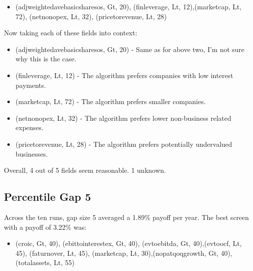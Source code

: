 \begin{itemize}
    \item (adjweightedavebasicsharesos, Gt, 20), (finleverage, Lt, 12),\newline (marketcap, Lt, 72), (netnonopex, Lt, 32), (pricetorevenue, Lt, 28)
\end{itemize}

Now taking each of these fields into context:
\begin{itemize}
    \item (adjweightedavebasicsharesos, Gt, 20) - Same as for above two, I'm not sure why this is the case.
    \item (finleverage, Lt, 12) - The algorithm prefers companies with low interest payments.
    \item (marketcap, Lt, 72) - The algorithm prefers smaller companies.
    \item (netnonopex, Lt, 32) - The algorithm prefers lower non-business related expenses.
    \item (pricetorevenue, Lt, 28) - The algorithm prefers potentially undervalued businesses.
\end{itemize}

Overall, 4 out of 5 fields seem reasonable. 1 unknown.

\subsection{Percentile Gap 5}
Across the ten runs, gap size 5 averaged a 1.89\% payoff per year. The best screen with a payoff of 3.22\% was:

\begin{itemize}
    \item (croic, Gt, 40), (ebittointerestex, Gt, 40), (evtoebitda, Gt, 40),\newline (evtoocf, Lt, 45), (faturnover, Lt, 45), (marketcap, Lt, 30),\newline (nopatqoqgrowth, Gt, 40), (totalassets, Lt, 55)
\end{itemize}


